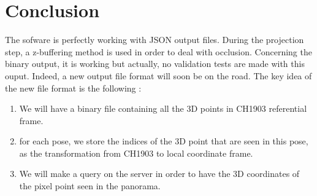\documentclass[a4paper, 11pt]{article}
\begin{document}
\section*{Conclusion}
  The sofware is perfectly working with JSON output files. During the projection step, a z-buffering method is used in order to
  deal with occlusion. Concerning the binary output, it is working but actually, no
  validation tests are made with this ouput. Indeed, a new output file format will soon be on the road. The key idea of the
  new file format is the following :
  \begin{enumerate}
      \item We will have a binary file containing all the 3D points in CH1903 referential frame.
      \item for each pose, we store the indices of the 3D point that are seen in this pose, as the transformation
            from CH1903 to local coordinate frame.
      \item We will make a query on the server in order to have the 3D coordinates of the pixel point seen in the panorama.
  \end{enumerate}
\end{document}
